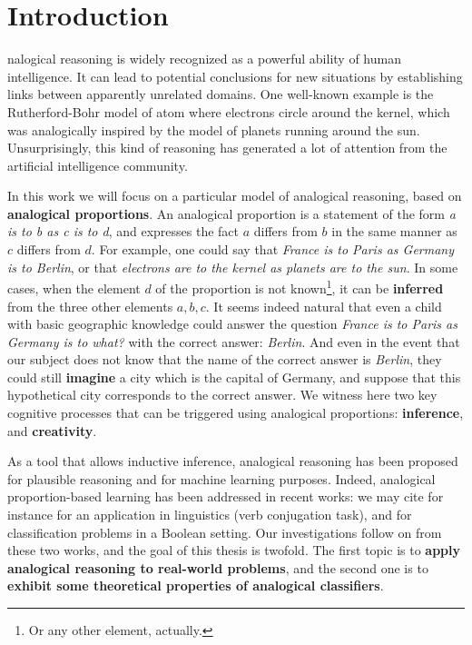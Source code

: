 \chapter*{Introduction}
nalogical reasoning is widely recognized as a powerful ability of
human intelligence.  It can lead to potential conclusions for new situations by
establishing links between apparently unrelated domains. One well-known example
is the Rutherford-Bohr model of atom where electrons circle around the kernel,
which was analogically inspired by the model of planets running around the sun.
Unsurprisingly, this kind of reasoning has generated a lot of attention from
the artificial intelligence community.

In this work we will focus on a particular model of analogical reasoning,
based on \textbf{analogical proportions}. An analogical proportion is a
statement of the form \textit{a is to b as c is to d}, and expresses the fact
$a$ differs from $b$ in the same manner as $c$ differs from $d$. For example,
one could say that \textit{France is to Paris as Germany is to Berlin}, or that
\textit{electrons are to the kernel as planets are to the sun}. In some cases,
when the element $d$ of the proportion is not known\footnote{Or any other
element, actually.}, it can be \textbf{inferred} from the three other elements
$a, b, c$. It seems indeed natural that even a child with basic geographic
knowledge could answer the question \textit{France is to Paris as Germany is to
what?} with the correct answer: \textit{Berlin}. And even in the event that our
subject does not know that the name of the correct answer is \textit{Berlin},
they could still \textbf{imagine} a city  which is the capital of Germany, and
suppose that this hypothetical city corresponds to the correct answer. We
witness here two key cognitive processes that can be triggered using analogical
proportions: \textbf{inference}, and \textbf{creativity}.

As a tool that allows inductive inference, analogical reasoning has been
proposed for plausible reasoning and for machine learning purposes. Indeed,
analogical proportion-based learning has been addressed in recent works: we may
cite for instance \cite{StrYvoCNLL05} for an application in linguistics (verb
conjugation task), and \cite{BayMicDelIJCAI07} for classification problems in a
Boolean setting. Our investigations follow on from these two works, and the
goal of this thesis is twofold. The first topic is to \textbf{apply analogical
reasoning to real-world problems}, and the second one is to \textbf{exhibit
some theoretical properties of analogical classifiers}.


